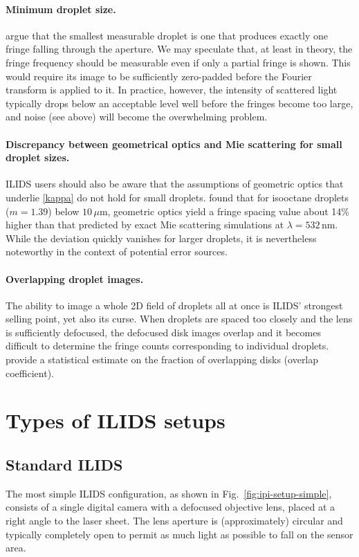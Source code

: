 \documentclass[11.5pt,oneside]{book}
\newcommand*{\figref}[1]{Fig.~\ref{#1}}
\begin{document}
\paragraph{Minimum droplet size.}
\citet{Damaschke02} argue that the smallest measurable droplet is one that
produces exactly one fringe falling through the aperture. We may speculate that, at least
in theory, the fringe frequency should be measurable even if only a partial
fringe is shown. This would require its image to be sufficiently zero-padded
before the Fourier transform is applied to it. In practice, however, the
intensity of scattered light typically drops below an acceptable level well before
the fringes become too large, and noise (see above) will become the overwhelming
problem.

\paragraph{Discrepancy between geometrical optics and Mie scattering for small droplet sizes.}
ILIDS users should also be aware that the assumptions of geometric optics
that underlie \eqref{kappa} do not hold for small droplets. \citet{Mounaim99}
found that for isooctane droplets ($m=1.39$) below $10\,\mu$m, geometric optics
yield a fringe spacing value about 14\% higher than that predicted by exact Mie
scattering simulations at $\lambda=532\,$nm. While the deviation quickly
vanishes for larger droplets, it is nevertheless noteworthy in the context of
potential error sources.

\paragraph{Overlapping droplet images.}
The ability to image a whole 2D field of droplets all at once is ILIDS' strongest
selling point, yet also its curse. When droplets are spaced too closely and the
lens is sufficiently defocused, the defocused disk images overlap and it becomes
difficult to determine the fringe counts corresponding to individual droplets.
\citet{Damaschke02} provide a statistical estimate on the fraction of
overlapping disks (overlap coefficient). 


\section{Types of ILIDS setups}
\label{sec:ipi-setup}
\subsection{Standard ILIDS}
The most simple ILIDS configuration, as shown in \figref{fig:ipi-setup-simple},
consists of a single digital camera with a defocused objective lens, placed at a right
angle to the laser sheet. The lens aperture is (approximately) circular and
typically completely open to permit as much light as possible to fall on the
sensor area.
\end{document}
